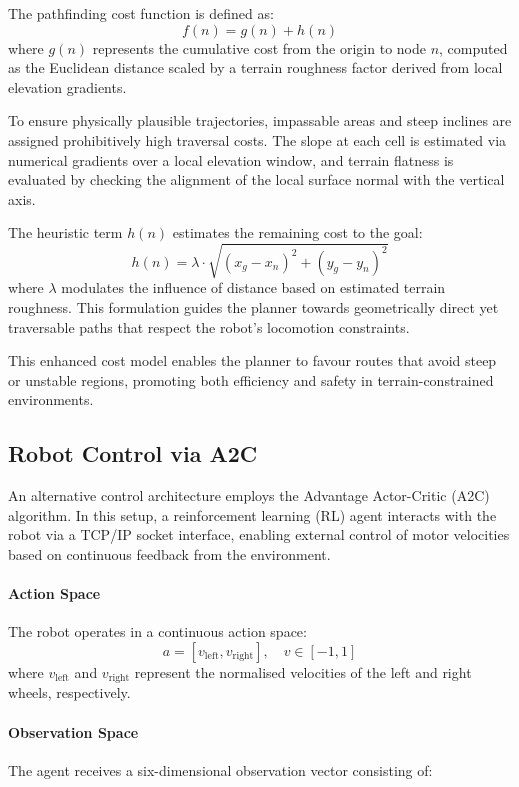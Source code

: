 \documentclass[11pt,twocolumn]{article}
\begin{document}
The pathfinding cost function is defined as:
\[
f(n) = g(n) + h(n)
\]
where $g(n)$ represents the cumulative cost from the origin to node $n$, computed as the Euclidean distance scaled by a terrain roughness factor derived from local elevation gradients. 

To ensure physically plausible trajectories, impassable areas and steep inclines are assigned prohibitively high traversal costs. The slope at each cell is estimated via numerical gradients over a local elevation window, and terrain flatness is evaluated by checking the alignment of the local surface normal with the vertical axis.

The heuristic term $h(n)$ estimates the remaining cost to the goal:
\[
h(n) = \lambda \cdot \sqrt{(x_g - x_n)^2 + (y_g - y_n)^2}
\]
where $\lambda$ modulates the influence of distance based on estimated terrain roughness. This formulation guides the planner towards geometrically direct yet traversable paths that respect the robot’s locomotion constraints.

This enhanced cost model enables the planner to favour routes that avoid steep or unstable regions, promoting both efficiency and safety in terrain-constrained environments.

\subsection{Robot Control via A2C}

An alternative control architecture employs the Advantage Actor-Critic (A2C) algorithm. In this setup, a reinforcement learning (RL) agent interacts with the robot via a TCP/IP socket interface, enabling external control of motor velocities based on continuous feedback from the environment.

\paragraph{Action Space}

The robot operates in a continuous action space:
\[
a = [v_{\text{left}}, v_{\text{right}}], \quad v \in [-1, 1]
\]
where $v_{\text{left}}$ and $v_{\text{right}}$ represent the normalised velocities of the left and right wheels, respectively.

\paragraph{Observation Space}

The agent receives a six-dimensional observation vector consisting of:
\end{document}
